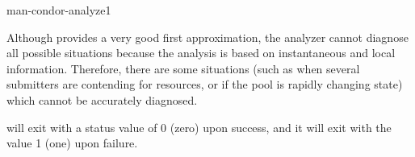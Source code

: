 \begin{ManPage}{}{man-condor-analyze}{1}
\begin{Options}
\end{Options}

\GenRem
Although  provides a very good first approximation,
the analyzer 
cannot diagnose all possible situations because the analysis is based on 
instantaneous and local information.  Therefore, there are some situations 
(such as when several submitters are contending for resources, or if the pool 
is rapidly changing state) which cannot be accurately diagnosed.

\Examples

\ExitStatus

 will exit with a status value of 0 (zero) upon success,
and it will exit with the value 1 (one) upon failure.

\end{ManPage}
